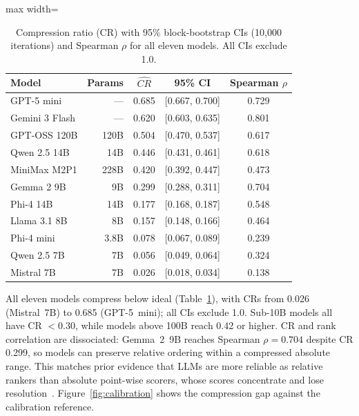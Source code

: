 \documentclass[11pt]{article}
\begin{document}
\begin{table}[htbp]
\centering
\caption{Compression ratio (CR) with 95\% block-bootstrap CIs
(10{,}000 iterations) and Spearman $\rho$ for all eleven models. All
CIs exclude 1.0.}
\label{tab:compression}
\small
\begin{adjustbox}{max width=\columnwidth}
\begin{tabular}{@{}lrccc@{}}
\toprule
\textbf{Model} & \textbf{Params} & $\widehat{\mathit{CR}}$ &
\textbf{95\% CI} & \textbf{Spearman} $\rho$ \\
\midrule
GPT-5 mini      & ---  & 0.685 & [0.667, 0.700] & 0.729 \\
Gemini 3 Flash  & ---  & 0.620 & [0.603, 0.635] & 0.801 \\
GPT-OSS 120B    & 120B & 0.504 & [0.470, 0.537] & 0.617 \\
Qwen 2.5 14B    & 14B  & 0.446 & [0.431, 0.461] & 0.618 \\
MiniMax M2P1    & 228B & 0.420 & [0.392, 0.447] & 0.473 \\
Gemma 2 9B      & 9B   & 0.299 & [0.288, 0.311] & 0.704 \\
Phi-4 14B       & 14B  & 0.177 & [0.168, 0.187] & 0.548 \\
Llama 3.1 8B    & 8B   & 0.157 & [0.148, 0.166] & 0.464 \\
Phi-4 mini      & 3.8B & 0.078 & [0.067, 0.089] & 0.239 \\
Qwen 2.5 7B     & 7B   & 0.056 & [0.049, 0.064] & 0.324 \\
Mistral 7B      & 7B   & 0.026 & [0.018, 0.034] & 0.138 \\
\bottomrule
\end{tabular}
\end{adjustbox}
\end{table}

All eleven models compress below ideal (Table~\ref{tab:compression}),
with CRs from 0.026 (Mistral~7B) to 0.685 (GPT-5~mini); all CIs exclude
1.0. Sub-10B models all have CR $<0.30$, while models above 100B reach
0.42 or higher. CR and rank correlation are dissociated: Gemma~2~9B
reaches Spearman $\rho=0.704$ despite CR 0.299, so models can preserve
relative ordering within a compressed absolute range. This matches prior
evidence that LLMs are more reliable as relative rankers than absolute
point-wise scorers, whose scores concentrate and lose resolution~\citep{zheng2023judging,liu2023geval}.
Figure~\ref{fig:calibration} shows the compression gap against the
calibration reference.
\end{document}
